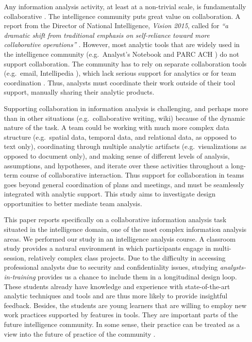 Any information analysis activity, at least at a non-trivial scale, is
fundamentally collaborative \cite{Convertino2011}. The intelligence community
puts great value on collaboration. A report from the Director of National
Intelligence, \emph{Vision 2015},  called for \emph{``a dramatic shift from
traditional emphasis on self-reliance toward more collaborative operations''}
\cite[p.13]{Vision2015}. However, most analytic tools that are widely used in
the intelligence community (e.g.~Analyst's Notebook \cite{IBM} and PARC ACH
\cite{PARC}) do not support collaboration. The community has to rely on separate
collaboration tools (e.g.~email, Intellipedia \cite{Intelink2017}), which lack
serious support for analytics or for team coordination \cite{Treverton2016}. Thus,
analysts must coordinate their work outside of their tool support, manually
sharing their analytic products.

Supporting collaboration in information analysis is challenging, and perhaps
more than in other situations (e.g.~collaborative writing, wiki) because of the
dynamic nature of the task. A team could be working with much more complex data
structure (e.g.~spatial data, temporal data, and relational data, as opposed to
text only), coordinating through multiple analytic artifacts
(e.g.~visualizations as opposed to document only), and making sense of different
levels of analysis, assumptions, and hypotheses, and iterate over these
activities throughout a long-term course of collaborative interaction. Thus
support for collaboration in teams goes beyond general coordination of plans and
meetings, and must be seamlessly integrated with analytic support. This study
aims to investigate design opportunities to better mediate team analysis.

This paper reports specifically on a collaborative information analysis task
situated in the intelligence domain, one of the most complex information
analysis areas. We performed our study in an intelligence analysis course. A
classroom study provides a natural environment in which participants engage in
multi-session, relatively complex class projects. Due to the difficulty in
accessing professional analysts due to security and confidentiality issues,
studying \emph{analysts-in-training} provides us a chance to include them in a
longitudinal design loop. These students already have knowledge and experience
with state-of-the-art analytic techniques and tools and are thus more likely to
provide insightful feedback. Besides, the students are young learners that are
willing to employ new work practices supported by features in tools. They are
important parts of the future intelligence community. In some sense, their
practice can be treated as a view into the future of practice of the community
\cite{Martin2014}.

